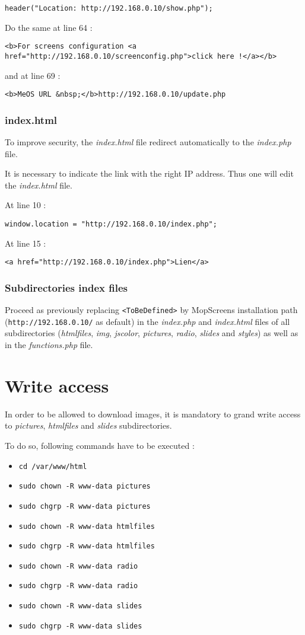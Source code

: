 \documentclass[a4paper]{ffco-rapport}
\begin{document}
			\verb|header("Location: http://192.168.0.10/show.php");|

			Do the same at line 64 :
			
			\scriptsize
			\verb|<b>For screens configuration <a href="http://192.168.0.10/screenconfig.php">click here !</a></b>|
			\normalsize
			
			and at line 69 :
			
			\verb|<b>MeOS URL &nbsp;</b>http://192.168.0.10/update.php|
		
		\subsubsection{index.html}
			To improve security, the \emph{index.html} file redirect automatically to the \emph{index.php} file.
			
			It is necessary to indicate the link with the right IP address. Thus one will edit the \emph{index.html} file.
		
			At line 10 :
		
			\verb|window.location = "http://192.168.0.10/index.php";|
		
			At line 15 :
		
			\verb|<a href="http://192.168.0.10/index.php">Lien</a>|
		
		\subsubsection{Subdirectories index files}
		
			Proceed as previously replacing \verb|<ToBeDefined>| by MopScreens installation path (\verb|http://192.168.0.10/| as default) in the \emph{index.php} and \emph{index.html} files of all subdirectories (\emph{htmlfiles}, \emph{img}, \emph{jscolor}, \emph{pictures},  \emph{radio}, \emph{slides} and \emph{styles}) as well as in the \emph{functions.php} file.
		
\section{Write access}
	In order to be allowed to download images, it is mandatory to grand write access to \emph{pictures}, \emph{htmlfiles} and \emph{slides} subdirectories.

	To do so, following commands have to be executed :
	
	\begin{itemize}
		\item \verb|cd /var/www/html|
		\item \verb|sudo chown -R www-data pictures|
		\item \verb|sudo chgrp -R www-data pictures|
		\item \verb|sudo chown -R www-data htmlfiles|
		\item \verb|sudo chgrp -R www-data htmlfiles|
		\item \verb|sudo chown -R www-data radio|
		\item \verb|sudo chgrp -R www-data radio|
		\item \verb|sudo chown -R www-data slides|
		\item \verb|sudo chgrp -R www-data slides|
	\end{itemize}
	
\end{document}
